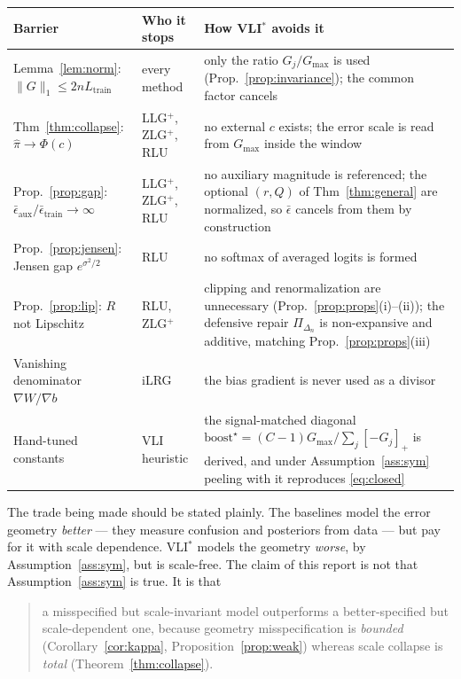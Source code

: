 \documentclass[11pt]{article}
\theoremstyle{remark}
\newcommand{\pos}[1]{\left[#1\right]_+}
\newcommand{\simplex}{\Delta_n}
\begin{document}
\begin{center}
\begin{tabular}{p{4.3cm}p{4.0cm}p{5.2cm}}
\toprule
Barrier & Who it stops & How VLI$^*$ avoids it \\
\midrule
Lemma~\ref{lem:norm}: $\|G\|_1 \le 2nL_{\mathrm{train}}$
  & every method
  & only the ratio $G_j/G_{\max}$ is used (Prop.~\ref{prop:invariance}); the
    common factor cancels \\
\addlinespace
Thm~\ref{thm:collapse}: $\widehat\pi \to \Phi(c)$
  & LLG$^+$, ZLG$^+$, RLU
  & no external $c$ exists; the error scale is read from $G_{\max}$ inside
    the window \\
\addlinespace
Prop.~\ref{prop:gap}: $\bar\epsilon_{\mathrm{aux}}/\bar\epsilon_{\mathrm{train}}\to\infty$
  & LLG$^+$, ZLG$^+$, RLU
  & no auxiliary magnitude is referenced; the optional $(r,Q)$ of
    Thm~\ref{thm:general} are normalized, so $\bar\epsilon$ cancels from them
    by construction \\
\addlinespace
Prop.~\ref{prop:jensen}: Jensen gap $e^{\sigma^2/2}$
  & RLU
  & no softmax of averaged logits is formed \\
\addlinespace
Prop.~\ref{prop:lip}: $R$ not Lipschitz
  & RLU, ZLG$^+$
  & clipping and renormalization are unnecessary
    (Prop.~\ref{prop:props}(i)--(ii)); the defensive repair
    $\Pi_{\simplex}$ is non-expansive and additive, matching
    Prop.~\ref{prop:props}(iii) \\
\addlinespace
Vanishing denominator $\nabla W/\nabla b$
  & iLRG
  & the bias gradient is never used as a divisor \\
\addlinespace
Hand-tuned constants
  & VLI heuristic
  & the signal-matched diagonal
    $\mathrm{boost}^\star = (C-1)G_{\max}/\sum_j\pos{-G_j}$ is derived, and
    under Assumption~\ref{ass:sym} peeling with it reproduces
    \eqref{eq:closed} \\
\bottomrule
\end{tabular}
\end{center}

The trade being made should be stated plainly. The baselines model the error
geometry \emph{better} --- they measure confusion and posteriors from data ---
but pay for it with scale dependence. VLI$^*$ models the geometry
\emph{worse}, by Assumption~\ref{ass:sym}, but is scale-free. The claim of
this report is not that Assumption~\ref{ass:sym} is true. It is that

\begin{quote}
a misspecified but scale-invariant model outperforms a better-specified but
scale-dependent one, because geometry misspecification is \emph{bounded}
(Corollary~\ref{cor:kappa}, Proposition~\ref{prop:weak}) whereas scale
collapse is \emph{total} (Theorem~\ref{thm:collapse}).
\end{quote}
\end{document}
